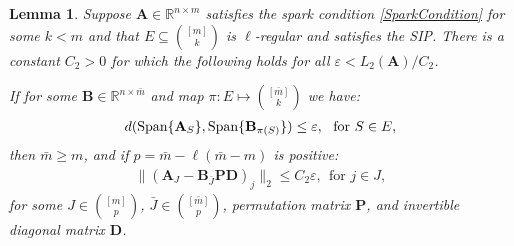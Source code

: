\documentclass[9pt,twocolumn]{pnas-new}
\newtheorem{lemma}{Lemma}
\begin{document}
\begin{lemma}\label{MainLemma}
Suppose $\mathbf{A} \in \mathbb{R}^{n \times m}$ satisfies the spark condition \eqref{SparkCondition} for some $k < m$ and that $E \subseteq {[m] \choose k}$ is $\ell$-regular and satisfies the SIP. There is a constant $C_2 > 0$ for which the following holds for all $\varepsilon < L_2(\mathbf{A}) / C_2$. 

If for some  $\mathbf{B} \in \mathbb{R}^{n \times \bar m}$ and map $\pi: E \mapsto {[\bar m] \choose k}$ we have:
\begin{align}\label{GapUpperBound}
d(\text{\rm Span}\{\mathbf{A}_{S}\}, \text{\rm Span}\{\mathbf{B}_{\pi(S)}\}) \leq \varepsilon, \ \  \text{for $S \in E$},
\end{align}
%
then $\bar m \geq m$, and if $p = \bar m - \ell(\bar m - m)$ is positive:
\begin{align}\label{MainLemmaBPD}
\|(\mathbf{A}_J - \mathbf{B}_{\bar J}\mathbf{PD})_j\|_2 \leq C_2 \varepsilon, \ \  \text{for } j \in J,
\end{align}
for some $J \in {[m] \choose p}$, $\bar J \in {[\bar m] \choose p}$, permutation matrix $\mathbf{P}$, and invertible diagonal matrix $\mathbf{D}$.
\end{lemma}

%
\end{document}
